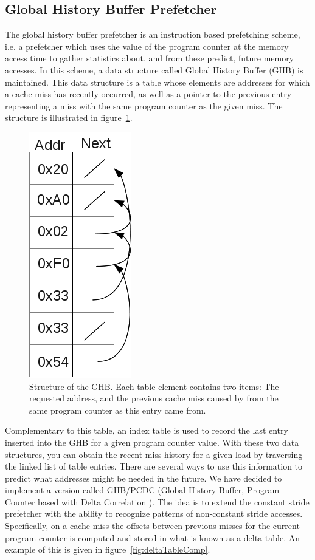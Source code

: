 \subsection{Global History Buffer Prefetcher}
\label{sec:ghbPcdcPrefetcher}

The global history buffer prefetcher is an instruction based
prefetching scheme, i.e. a prefetcher which uses the value of the
program counter at the memory access time to gather statistics about,
and from these predict, future memory accesses. In
this scheme, a data structure called Global History Buffer (GHB) is maintained. This data structure is a table whose elements are
addresses for which a cache miss has recently occurred, as well as a
pointer to the previous entry representing a miss
with the same program counter as the given miss. The
structure is illustrated in figure~\ref{fig:ghbStruct}.

\begin{figure}[ht]
  \centering
  \includegraphics[scale=0.5]{figures/ghb_diag.png}
  \caption{\label{fig:ghbStruct} Structure of the GHB. Each table
    element contains two items: The requested address, and the
    previous cache miss caused by from the same program counter as
    this entry came from.}
\end{figure}

Complementary to this table, an index table is used to record the last
entry inserted into the GHB for a given program counter value. With
these two data structures, you can obtain the recent miss history for a
given load by traversing the linked list of table entries. There are
several ways to use this information to predict what addresses might
be needed in the future. We have decided to implement a version called
GHB/PCDC (Global History Buffer, Program Counter based with Delta
Correlation \cite{Grannas}). The idea is to extend the constant stride
prefetcher with the ability to recognize patterns of non-constant
stride accesses. Specifically, on a cache miss the offsets between
previous misses for the current program counter is computed and stored
in what is known as a delta table. An example of this is given in
figure~\ref{fig:deltaTableComp}. 

